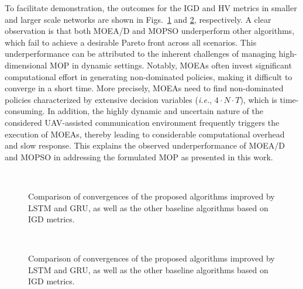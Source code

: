\documentclass[10pt,journal,compsoc]{IEEEtran}
\begin{document}
\par To facilitate demonstration, the outcomes for the IGD and HV metrics in smaller and larger scale networks are shown in Figs.~\ref{fig:IGD} and \ref{fig:HV}, respectively. A clear observation is that both MOEA/D and MOPSO underperform other algorithms, which fail to achieve a desirable Pareto front across all scenarios. This underperformance can be attributed to the inherent challenges of managing high-dimensional MOP in dynamic settings. Notably, MOEAs often invest significant computational effort in generating non-dominated policies, making it difficult to converge in a short time. More precisely, MOEAs need to find non-dominated policies characterized by extensive decision variables (\emph{i.e.}, $4 \cdot N \cdot T$), which is time-consuming. In addition, the highly dynamic and uncertain nature of the considered UAV-assisted communication environment frequently triggers the execution of MOEAs, thereby leading to considerable computational overhead and slow response. This explains the observed underperformance of MOEA/D and MOPSO in addressing the formulated MOP as presented in this work.

\begin{figure}[t]
    \centering
    \\  %
    \caption{Comparison of convergences of the proposed algorithms improved by LSTM and GRU, as well as the other baseline algorithms based on IGD metrics.}  %
    \label{fig:IGD}
\end{figure}

\begin{figure}[t]
    \centering
    \\  %
    \caption{Comparison of convergences of the proposed algorithms improved by LSTM and GRU, as well as the other baseline algorithms based on IGD metrics.}  %
    \label{fig:HV}
\end{figure}
\end{document}

